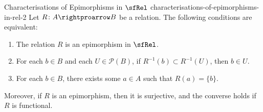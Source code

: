 \begin{proposition}{Characterisations of Epimorphisms in $\sfRel$ \rmII}{characterisations-of-epimorphisms-in-rel-2}%
    Let $R\colon A\rightproarrow B$ be a relation. The following conditions are equivalent:%
    \begin{enumerate}
        \item\label{characterisations-of-epimorphisms-in-rel-2-1}The relation $R$ is an epimorphism in $\sfRel$.
        \item\label{characterisations-of-epimorphisms-in-rel-2-2}For each $b\in B$ and each $U\in\mathcal{P}(B)$, if $R^{-1}(b)\subset R^{-1}(U)$, then $b\in U$.
        \item\label{characterisations-of-epimorphisms-in-rel-2-3}For each $b\in B$, there exists some $a\in A$ such that $R(a)=\{b\}$.
    \end{enumerate}
    Moreover, if $R$ is an epimorphism, then it is surjective, and the converse holds if $R$ is functional.
\end{proposition}

